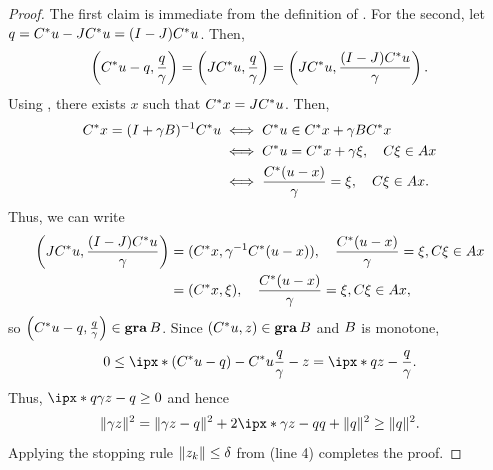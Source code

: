 \documentclass[11pt]{article}
\begin{document}
\begin{proof}
    The first claim is immediate from the definition of .
    For the second, let $q={C}^* u - J{C}^* u = (I-J){C}^* u$.
    Then,
    \begin{equation}
        \left({C}^* u -q,\frac{q}{\gamma}\right) = \left(J{C}^* u, \frac{q}{\gamma}\right) = \left(J{C}^* u,\frac{(I-J){C}^* u}{\gamma}\right).
    \end{equation}
    Using , there exists $x$ such that ${C}^* x = J {C}^*u$.
    Then,
    \begin{align}
        {C}^* x = (I+\gamma {B})^{-1}{C}^* u &\iff  {C}^* u \in {C}^*x + \gamma {B} {C}^*x \\
        &\iff  {C}^* u = {C}^*x + \gamma \xi, \quad {C} \xi \in {A} x \\
        &\iff  \frac{{C}^* (u - x)}{\gamma} = \xi, \quad {C} \xi \in {A} x.
    \end{align}
    Thus, we can write 
    \begin{align}
        \left(J{C}^* u,\frac{(I-J){C}^* u}{\gamma}\right) &= ({C}^* x, \gamma^{-1}{C}^* (u - x)) ,\quad \frac{{C}^* (u - x)}{\gamma} = \xi, {C} \xi \in {A} x \\
        &= ({C}^* x, \xi) ,\quad \frac{{C}^* (u - x)}{\gamma} = \xi, {C} \xi \in {A} x,
    \end{align}
    so $\left({C}^* u -q,\frac{q}{\gamma}\right)\in\mathop{\bf gra} {B}$.
    Since $({C}^* u, z) \in\mathop{\bf gra} {B}$ and ${B}$ is monotone,
    \begin{align}
        0 \leq \ip{(\Ccal^* u -q) - \Ccal^* u}{\frac{q}{\gamma} - z} = \ip{q}{z-\frac{q}{\gamma}}.
    \end{align}
    Thus, $\ip{q}{\gamma z-q}\geq0$ and hence
    \begin{align}
        \norm{\gamma z}^2 = \norm{\gamma z - q}^2 + 2\ip{\gamma z - q}{q} + \norm{q}^2 \geq \norm{q}^2.
    \end{align}
    Applying the stopping rule $\lVert z_k\rVert \leq \delta$ from  (line 4) completes the proof.
\end{proof}
\end{document}
